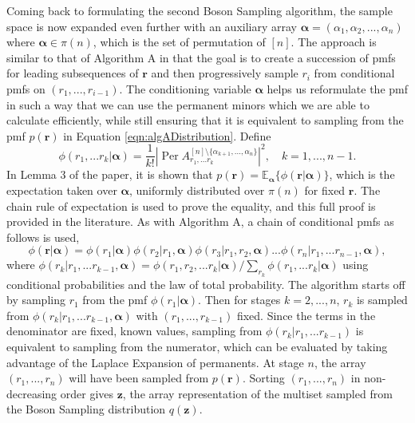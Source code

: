 \documentclass[ %
                    author={Manan Vaswani},
                supervisor={Dr. Raphael Clifford},
                    degree={MEng},
                     title={A multi-core CPU implementation of the classical Boson Sampling algorithm},
                  subtitle={},
                      type={},
                      year={2019} ]{dissertation}
\theoremstyle{plain}
\theoremstyle{definition}
\DeclareMathOperator*{\Per}{\mathrm{Per}}
\begin{document}
Coming back to formulating the second Boson Sampling algorithm, the sample space is now expanded even further with an auxiliary array $\mathbf{\alpha} = (\alpha_1, \alpha_2, ... , \alpha_n)$ where $\mathbf{\alpha} \in \pi(n)$, which is the set of permutation of $[n]$. The approach is similar to that of Algorithm A in that the goal is to create a succession of pmfs for leading subsequences of $\mathbf{r}$ and then progressively sample $r_i$ from conditional pmfs on $(r_1, ... , r_{i-1})$. The conditioning variable $\mathbf{\alpha}$ helps us reformulate the pmf in such a way that we can use the permanent minors which we are able to calculate efficiently, while still ensuring that it is equivalent to sampling from the pmf $p(\mathbf{r})$ in Equation \ref{eqn:algADistribution}.
Define
\begin{equation}
\phi(r_1, ... r_k | \mathbf{\alpha}) = \frac{1}{k!} \left| \Per A_{r_1, ... r_k}^{[n] \setminus \{\alpha_{k+1},  ... , \alpha_n\}} \right|^2, \quad k = 1, ... , n-1.
\end{equation}
In Lemma 3 of the paper, it is shown that $p(\mathbf{r}) = \mathbb{E}_{\mathbf{\alpha}}\{\phi(\mathbf{r} | \mathbf{\alpha})\}$, which is the expectation taken over $\mathbf{\alpha}$, uniformly distributed over $\pi(n)$ for fixed $\mathbf{r}$. The chain rule of expectation is used to prove the equality, and this full proof is provided in the literature. As with Algorithm A, a chain of conditional pmfs as follows is used,
\begin{equation} \label{eqn:algBChainRule}
\phi(\mathbf{r} | \mathbf{\alpha}) = \phi(r_1 | \mathbf{\alpha}) \phi(r_2 | r_1, \mathbf{\alpha}) \phi(r_3 | r_1, r_2, \mathbf{\alpha}) ... \phi(r_n | r_1, ... r_{n-1}, \mathbf{\alpha}), 
\end{equation}
where $\phi(r_k | r_1, ... r_{k-1}, \mathbf{\alpha}) = \phi(r_1, r_2, ... r_k | \mathbf{\alpha}) / \sum_{r_k} \phi(r_1, ... r_k | \mathbf{\alpha})$ using conditional probabilities and the law of total probability. The algorithm starts off by sampling $r_1$ from the pmf $\phi(r_1 | \mathbf{\alpha})$. Then for stages $k = 2 , ... , n$, $r_k$ is sampled from $\phi(r_k | r_1, ... r_{k-1}, \mathbf{\alpha})$ with $(r_1, ... , r_{k-1})$ fixed. Since the terms in the denominator are fixed, known values, sampling from $\phi(r_k | r_1, ... r_{k-1})$ is equivalent to sampling from the numerator, which can be evaluated by taking advantage of the Laplace Expansion of permanents. At stage $n$, the array $(r_1, ... , r_n)$ will have been sampled from $p(\mathbf{r})$. Sorting $(r_1, ... , r_n)$ in non-decreasing order gives $\mathbf{z}$, the array representation of the multiset sampled from the Boson Sampling distribution $q(\mathbf{z})$.
\end{document}
